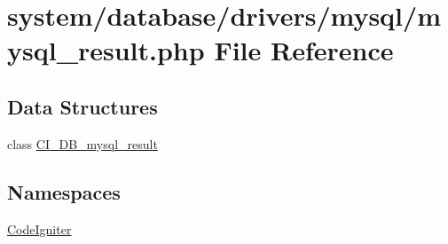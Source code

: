 \hypertarget{mysql__result_8php}{\section{system/database/drivers/mysql/mysql\-\_\-result.php File Reference}
\label{mysql__result_8php}
}
\subsection*{Data Structures}
\begin{DoxyCompactItemize}
\item 
class \hyperlink{class_c_i___d_b__mysql__result}{C\-I\-\_\-\-D\-B\-\_\-mysql\-\_\-result}
\end{DoxyCompactItemize}
\subsection*{Namespaces}
\begin{DoxyCompactItemize}
\item 
\hyperlink{namespace_code_igniter}{Code\-Igniter}
\end{DoxyCompactItemize}
